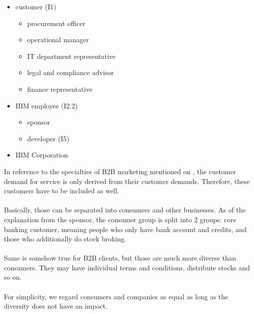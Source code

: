 \begin{multicols}{2}
\begin{itemize}
    \item customer (I1)
    \begin{itemize}
        \item procurement officer
        \item operational manager
        \item IT department representative
        \item legal and compliance advisor
        \item finance representative
    \end{itemize} \columnbreak
    
    \item IBM employee (I2.2)
    \begin{itemize}
        \item sponsor
        \item developer (I5)
    \end{itemize}
    \item IBM Corporation
\end{itemize}
\end{multicols}

In reference to the specialties of B2B marketing mentioned on \cpageref{}, the customer demand for service is only derived from their customer demands. Therefore, these customers have to be included as well. 

\paragraph{} Basically, those can be separated into consumers and other businesses. As of the explanation from the sponsor, the consumer group is split into 2 groups: core banking customer, meaning people who only have bank account and credits, and those who additionally do stock broking. 

\paragraph{} Same is somehow true for B2B clients, but those are much more diverse than consumers. They may have individual terms and conditions, distribute stocks and so on. 

\paragraph{} For simplicity, we regard consumers and companies as equal as long as the diversity does not have an impact.

